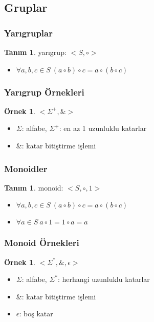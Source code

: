 \documentclass[dvipsnames]{beamer}
\theoremstyle{definition}
\newtheorem{tanim}[theorem]{Tanım}
\theoremstyle{example}
\newtheorem{ornek}[theorem]{Örnek}
\theoremstyle{plain}
\begin{document}
\subsection{Gruplar}

\begin{frame}
  \frametitle{Yarıgruplar}

  \begin{tanim}
    \alert{yarıgrup}: $<S,\circ>$
    \begin{itemize}
      \item $\forall a,b,c \in S~(a \circ b) \circ c = a \circ (b \circ c)$
    \end{itemize}
  \end{tanim}
\end{frame}

\begin{frame}
  \frametitle{Yarıgrup Örnekleri}

  \begin{ornek}
    $<\Sigma^+,\&>$

    \begin{itemize}
      \item $\Sigma$: alfabe, $\Sigma^+$: en az 1 uzunluklu katarlar
      \item $\&$: katar bitiştirme işlemi
    \end{itemize}
  \end{ornek}
\end{frame}

\begin{frame}
  \frametitle{Monoidler}

  \begin{tanim}
    \alert{monoid}: $<S,\circ,1>$

    \begin{itemize}
      \item $\forall a,b,c \in S~(a \circ b) \circ c = a \circ (b \circ c)$
      \item $\forall a \in S~a \circ 1 = 1 \circ a = a$
    \end{itemize}
  \end{tanim}
\end{frame}

\begin{frame}
  \frametitle{Monoid Örnekleri}

  \begin{ornek}
    $<\Sigma^*,\&,\epsilon>$

    \begin{itemize}
      \item $\Sigma$: alfabe, $\Sigma^*$: herhangi uzunluklu katarlar
      \item $\&$: katar bitiştirme işlemi
      \item $\epsilon$: boş katar
    \end{itemize}
  \end{ornek}
\end{frame}
\end{document}
